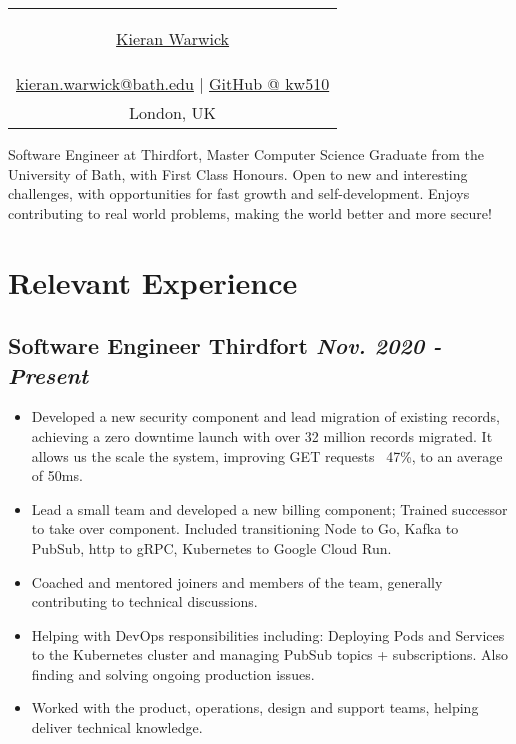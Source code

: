 \documentclass[11pt,a4paper]{report}
\begin{document}

\begin{center}
		\begin{tabular}{c}
			\begin{LARGE}
				\href{https://www.linkedin.com/in/kieran-warwick}{Kieran Warwick}
			\end{LARGE}
			\\
				\href{mailto:kieran.warwick@bath.edu}{kieran.warwick@bath.edu}
				$\vert$
				\href{https://github.com/kw510}{GitHub @ kw510}
			\\
				London, UK  
	\end{tabular}
\end{center}

\vfill

Software Engineer at Thirdfort, Master Computer Science Graduate from the University of Bath, with First Class Honours.  
Open to new and interesting challenges, with opportunities for fast growth and self-development. Enjoys contributing to 
real world problems, making the world better and more secure!

\section*{\normalfont Relevant Experience}
	\subsection*{
			Software Engineer
			\hspace{0.59in}\hfill\normalfont Thirdfort 
			\hfill\normalfont\emph{ Nov. 2020 - Present }
		}

		\begin{itemize}
			\item Developed a new security component and lead migration of existing records, 
						achieving a zero downtime launch with over 32 million records migrated. 
						It allows us the scale the system, improving GET requests ~47\%, to an average of 50ms.
			\item Lead a small team and developed a new billing component; Trained successor to take over component.
						Included transitioning Node to Go, Kafka to PubSub, http to gRPC, Kubernetes to Google Cloud Run.
			\item Coached and mentored joiners and members of the team, generally contributing to technical discussions.
			\item Helping with DevOps responsibilities including:
						Deploying Pods and Services to the Kubernetes cluster and
						managing PubSub topics + subscriptions. Also finding and solving ongoing production issues.
			\item Worked with the product, operations, design and support teams, helping deliver technical knowledge.
		\end{itemize}
\end{document}
